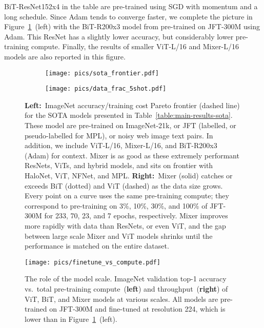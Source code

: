 \documentclass{article}
\newcommand{\name}{Mixer}
\begin{document}
BiT-ResNet152x4 in the table are pre-trained using SGD with momentum and a long schedule.
Since Adam tends to converge faster, we complete the picture in Figure~\ref{fig:main-sota-and-jft-fractions}~(left) with the BiT-R200x3 model from \citet{Dosovitskiy2021} pre-trained on JFT-300M using Adam.
This ResNet has a slightly lower accuracy, but considerably lower pre-training compute.
Finally, the results of smaller ViT-L/16 and \name{}-L/16 models are also reported in this figure.

\begin{figure}[tb]
\centering
\begin{subfigure}{.44\textwidth}
  \centering\vspace{-5pt}
  \texttt{[image: pics/sota\_frontier.pdf]}
\end{subfigure}\begin{subfigure}{.55\textwidth}
  \centering
  \texttt{[image: pics/data\_frac\_5shot.pdf]}
\end{subfigure}
\caption{
  {\bf Left:}~ImageNet accuracy/training cost Pareto frontier (dashed line) for the SOTA models  presented in Table~\ref{table:main-results-sota}.
  These model are pre-trained on ImageNet-21k, or JFT (labelled, or pseudo-labelled for MPL), or noisy web image text pairs.
  In addition, we include ViT-L/16, \name{}-L/16, and BiT-R200x3 (Adam) for context.
  \name{} is as good as these extremely performant ResNets, ViTs, and hybrid models,
  and sits on frontier with HaloNet, ViT, NFNet, and MPL.
  {\bf Right:}~\name{} (solid) catches or exceeds BiT (dotted) and ViT (dashed) as the data size grows.
  Every point on a curve uses the same pre-training compute; they correspond to pre-training on 3\%, 10\%, 30\%, and 100\% of JFT-300M for 233, 70, 23, and 7 epochs, respectively.
  \name{} improves more rapidly with data than ResNets, or even ViT, and the gap between large scale \name{} and ViT models shrinks until the performance is matched on the entire dataset.
}
\label{fig:main-sota-and-jft-fractions}
\end{figure}

\begin{figure}[tb]
    \centering
    \texttt{[image: pics/finetune\_vs\_compute.pdf]}
  \caption{
  The role of the model scale.
  ImageNet validation top-1 accuracy vs.\ total pre-training compute~({\bf left}) and throughput~({\bf right}) of ViT, BiT, and \name{} models at various scales.
  All models are pre-trained on JFT-300M and fine-tuned at resolution 224, which is lower than in Figure~\ref{fig:main-sota-and-jft-fractions}~(left).}
  \label{fig:compute-frontier}
\end{figure}
\end{document}
